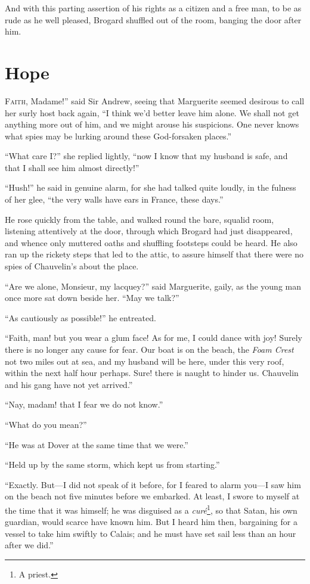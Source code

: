 \documentclass[paper=5.5in:8.5in,BCOR=7mm,twoside,DIV=calc,12pt,usegeometry,chapterprefix,endperiod,headings=big]{scrbook}
\begin{document}
And with this parting assertion of his rights as a citizen and a free man, to be as rude as he well pleased, Brogard shuffled out of the room, banging the door after him.

\chapter{Hope}
\lettrine[ante=``,lines=4]{F}{aith}, Madame!'' said Sir Andrew, seeing that Marguerite seemed desirous to call her surly host back again, \enquote{I think we'd better leave him alone. We shall not get anything more out of him, and we might arouse his suspicions. One never knows what spies may be lurking around these God-forsaken places.}

\enquote{What care I?} she replied lightly, \enquote{now I know that my husband is safe, and that I shall see him almost directly!}

\enquote{Hush!} he said in genuine alarm, for she had talked quite loudly, in the fulness of her glee, \enquote{the very walls have ears in France, these days.}

He rose quickly from the table, and walked round the bare, squalid room, listening attentively at the door, through which Brogard had just disappeared, and whence only muttered oaths and shuffling footsteps could be heard. He also ran up the rickety steps that led to the attic, to assure himself that there were no spies of Chauvelin's about the place.

\enquote{Are we alone, Monsieur, my lacquey?} said Marguerite, gaily, as the young man once more sat down beside her. \enquote{May we talk?}

\enquote{As cautiously as possible!} he entreated.

\enquote{Faith, man! but you wear a glum face! As for me, I could dance with joy! Surely there is no longer any cause for fear. Our boat is on the beach, the \textit{Foam Crest} not two miles out at sea, and my husband will be here, under this very roof, within the next half hour perhaps. Sure! there is naught to hinder us. Chauvelin and his gang have not yet arrived.}

\enquote{Nay, madam! that I fear we do not know.}

\enquote{What do you mean?}

\enquote{He was at Dover at the same time that we were.}

\enquote{Held up by the same storm, which kept us from starting.}

\enquote{Exactly. But---I did not speak of it before, for I feared to alarm you---I saw him on the beach not five minutes before we embarked. At least, I swore to myself at the time that it was himself; he was disguised as a \textit{curé}\footnote{A priest.}, so that Satan, his own guardian, would scarce have known him. But I heard him then, bargaining for a vessel to take him swiftly to Calais; and he must have set sail less than an hour after we did.}
\end{document}
